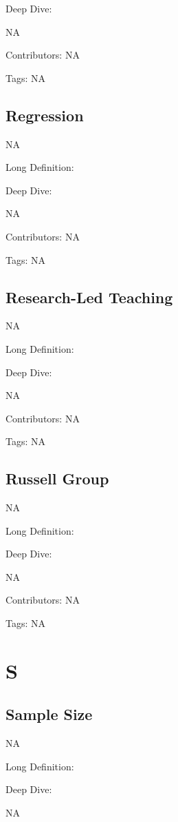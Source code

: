 \documentclass[
  letterpaper,
  DIV=11,
  numbers=noendperiod]{scrreprt}
\begin{document}
Deep Dive:

NA

Contributors: NA

Tags: NA

\section{Regression}\label{regression}

NA

Long Definition:

Deep Dive:

NA

Contributors: NA

Tags: NA

\section{Research-Led Teaching}\label{research-led-teaching}

NA

Long Definition:

Deep Dive:

NA

Contributors: NA

Tags: NA

\section{Russell Group}\label{russell-group}

NA

Long Definition:

Deep Dive:

NA

Contributors: NA

Tags: NA


\chapter{S}\label{s}

\section{Sample Size}\label{sample-size}

NA

Long Definition:

Deep Dive:

NA
\end{document}
